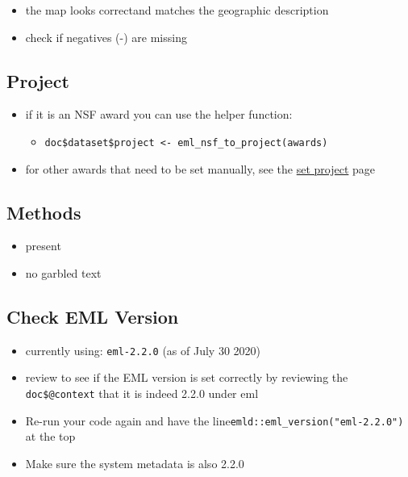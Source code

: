 \documentclass[
  letterpaper,
  DIV=11,
  numbers=noendperiod]{scrreprt}
\providecommand{\tightlist}{%
  \setlength{\itemsep}{0pt}\setlength{\parskip}{0pt}}\usepackage{longtable,booktabs,array}
\begin{document}
\begin{itemize}
\tightlist
\item
  the map looks correctand matches the geographic description
\item
  check if negatives (-) are missing
\end{itemize}

\hypertarget{project}{%
\subsection{Project}\label{project}}

\begin{itemize}
\tightlist
\item
  if it is an NSF award you can use the helper function:

  \begin{itemize}
  \tightlist
  \item
    \texttt{doc\$dataset\$project\ \textless{}-\ eml\_nsf\_to\_project(awards)}
  \end{itemize}
\item
  for other awards that need to be set manually, see the
  \href{https://nceas.github.io/datateam-training/reference/set-the-project-section.html}{set
  project} page
\end{itemize}

\hypertarget{methods-1}{%
\subsection{Methods}\label{methods-1}}

\begin{itemize}
\tightlist
\item
  present
\item
  no garbled text
\end{itemize}

\hypertarget{check-eml-version}{%
\subsection{Check EML Version}\label{check-eml-version}}

\begin{itemize}
\tightlist
\item
  currently using: \texttt{eml-2.2.0} (as of July 30 2020)
\item
  review to see if the EML version is set correctly by reviewing the
  \texttt{doc\$\textasciigrave{}@context\textasciigrave{}} that it is
  indeed 2.2.0 under eml
\item
  Re-run your code again and have the
  line\texttt{emld::eml\_version("eml-2.2.0")} at the top
\item
  Make sure the system metadata is also 2.2.0
\end{itemize}
\end{document}
